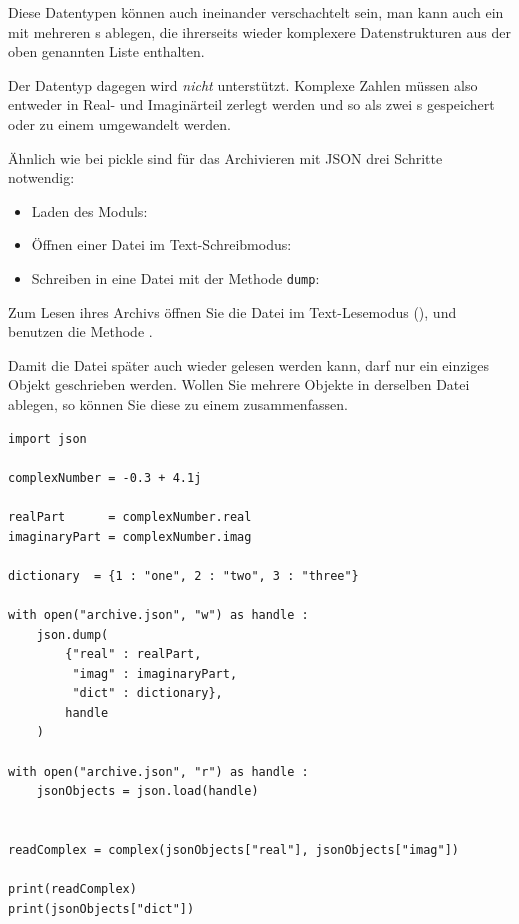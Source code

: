 Diese Datentypen können auch ineinander verschachtelt sein, \ie man kann auch ein  mit mehreren s ablegen, die ihrerseits wieder komplexere Datenstrukturen aus der oben genannten Liste enthalten.

Der Datentyp  dagegen wird \emph{nicht} unterstützt. Komplexe Zahlen müssen also entweder in Real- und Imaginärteil zerlegt werden und so als zwei s gespeichert oder zu einem  umgewandelt werden.

Ähnlich wie bei pickle sind für das Archivieren mit JSON drei Schritte notwendig: 
\begin{itemize}
\item Laden des Moduls: 
\item Öffnen einer Datei im Text-Schreibmodus: 
\item Schreiben in eine Datei mit der Methode \texttt{dump}: 
\end{itemize}

Zum Lesen ihres Archivs öffnen Sie die Datei im Text-Lesemodus (), und benutzen die Methode .

Damit die Datei später auch wieder gelesen werden kann, darf nur ein einziges Objekt geschrieben werden. Wollen Sie mehrere Objekte in derselben Datei ablegen, so können Sie diese zu einem  zusammenfassen.

\begin{codebox}
\begin{verbatim}
import json

complexNumber = -0.3 + 4.1j

realPart      = complexNumber.real
imaginaryPart = complexNumber.imag

dictionary  = {1 : "one", 2 : "two", 3 : "three"}

with open("archive.json", "w") as handle :
    json.dump(
        {"real" : realPart,
         "imag" : imaginaryPart,
         "dict" : dictionary},
        handle
    )
    
with open("archive.json", "r") as handle :
    jsonObjects = json.load(handle)
    

readComplex = complex(jsonObjects["real"], jsonObjects["imag"])

print(readComplex)
print(jsonObjects["dict"])
\end{verbatim}
\end{codebox}


